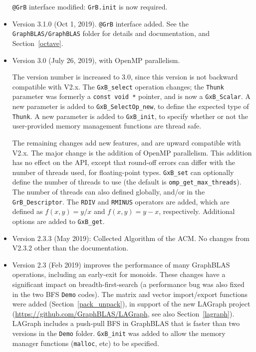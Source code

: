 \documentclass[12pt]{article}
\begin{document}
\begin{itemize}
    \verb'@GrB' interface modified:  \verb'GrB.init' is now required.

\item Version 3.1.0 (Oct 1, 2019).  \verb'@GrB' interface added.  See the
    \newline \verb'GraphBLAS/GraphBLAS' folder for details and documentation,
    and Section~\ref{octave}.

\item Version 3.0 (July 26, 2019), with OpenMP parallelism.

The version number is increased to 3.0, since
this version is not backward compatible with V2.x.  The \verb'GxB_select'
operation changes; the \verb'Thunk' parameter was formerly a
\verb'const void *' pointer, and is now a \verb'GxB_Scalar'.  A new parameter
is added to \verb'GxB_SelectOp_new', to define the expected type of
\verb'Thunk'.  A new parameter is added to \verb'GxB_init', to specify whether
or not the user-provided memory management functions are thread safe.

The remaining changes add new features, and are upward compatible with V2.x.
The major change is the addition of OpenMP parallelism.  This addition has no
effect on the API, except that round-off errors can differ with the number of
threads used, for floating-point types.  \verb'GxB_set' can optionally define
the number of threads to use (the default is \verb'omp_get_max_threads').  The
number of threads can also defined globally, and/or in the
\verb'GrB_Descriptor'.  The \verb'RDIV' and \verb'RMINUS' operators are added,
which are defined as $f(x,y)=y/x$ and $f(x,y)=y-x$, respectively.  Additional
options are added to \verb'GxB_get'.

\item Version 2.3.3 (May 2019): Collected Algorithm of the ACM.
No changes from V2.3.2 other than the documentation.

\item Version 2.3 (Feb 2019) improves the performance of many GraphBLAS
operations, including an early-exit for monoids.  These changes have a
significant impact on breadth-first-search (a performance bug was also fixed in
the two BFS \verb'Demo' codes).  The matrix and vector import/export functions
were added (Section~\ref{pack_unpack}), in support of the new LAGraph project
(\url{https://github.com/GraphBLAS/LAGraph}, see also Section~\ref{lagraph}).
LAGraph includes a push-pull BFS in GraphBLAS that is faster than two versions
in the \verb'Demo' folder.  \verb'GxB_init' was added to allow the memory
manager functions (\verb'malloc', etc) to be specified.


\end{itemize}
\end{document}
